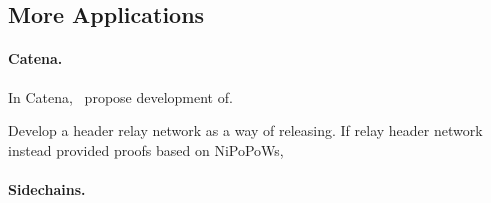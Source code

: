 \subsection{More Applications}

\paragraph{Catena.}

In Catena,~\cite{} propose development of.


Develop a header relay network as a way of releasing.
If relay header network instead provided proofs based on NiPoPoWs, 

\paragraph{Sidechains.}


